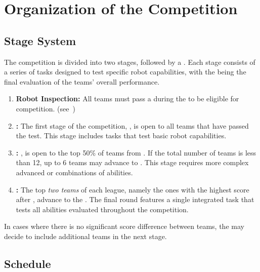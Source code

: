 \section{Organization of the Competition}\label{sec:procedure_during_competition}

\subsection{Stage System}\label{rule:stages}

The competition is divided into two stages, followed by a \FINAL{}. Each stage consists of a series of tasks designed to test specific robot capabilities, with the \FINAL{} being the final evaluation of the teams' overall performance.

\begin{enumerate}
	\item \textbf{Robot Inspection:} 
	All teams must pass a \RobotInspection{} during the \SetupDays{} to be eligible for competition. (see~)

	\item \textbf{\SONE{}:} The first stage of the competition, \SONE{}, is open to all teams that have passed the \RobotInspection{} test. This stage includes tasks that test basic robot capabilities.

	\item \textbf{\STWO:} \STWO{}, is open to the top 50\% of teams from \SONE{}. If the total number of teams is less than 12, up to 6 teams may advance to \STWO{}.
	This stage requires more complex advanced or combinations of abilities.

	\item \textbf{\FINAL:} The top \emph{two teams} of each league, namely the ones with the highest score after \STWO{}, advance to the \FINAL{}.
	The final round features a single integrated task that tests all abilities evaluated throughout the competition.

\end{enumerate}
In cases where there is no significant score difference between teams, the \TC{} may decide to include additional teams in the next stage.


\subsection{Schedule}\label{rule:schedule}

